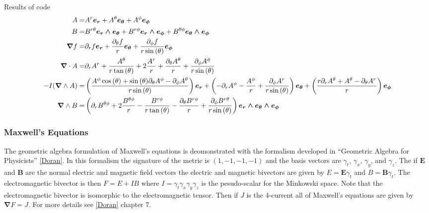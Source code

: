 \documentclass[letterpaper,10pt,english]{sphinxmanual}
\begin{document}
Results of code
  \begin{align*}
  A =& A^{r}\boldsymbol{e_{r}}+A^{\theta}\boldsymbol{e_{\theta}}+A^{\phi}\boldsymbol{e_{\phi}} \\
  B =& B^{r\theta}\boldsymbol{e_{r}\wedge e_{\theta}}+B^{r\phi}\boldsymbol{e_{r}\wedge e_{\phi}}+B^{\theta\phi}\boldsymbol{e_{\theta}\wedge e_{\phi}} \\
  \boldsymbol{\nabla}  f =& \partial_{r} f\boldsymbol{e_{r}}+\frac{\partial_{\theta} f}{r}\boldsymbol{e_{\theta}}+\frac{\partial_{\phi} f}{r \sin{\left (\theta \right )}}\boldsymbol{e_{\phi}} \\
  \boldsymbol{\nabla} \cdot A =& \partial_{r} A^{r} + \frac{A^{\theta}}{r \tan{\left (\theta \right )}} + 2 \frac{A^{r}}{r} + \frac{\partial_{\theta} A^{\theta}}{r} + \frac{\partial_{\phi} A^{\phi}}{r \sin{\left (\theta \right )}} \\
  -I (\boldsymbol{\nabla} \wedge A) =& \left ( \frac{A^{\phi} \cos{\left (\theta \right )} + \sin{\left (\theta \right )} \partial_{\theta} A^{\phi} - \partial_{\phi} A^{\theta}}{r \sin{\left (\theta \right )}}\right ) \boldsymbol{e_{r}}+\left ( - \partial_{r} A^{\phi} - \frac{A^{\phi}}{r} + \frac{\partial_{\phi} A^{r}}{r \sin{\left (\theta \right )}}\right ) \boldsymbol{e_{\theta}}+\left ( \frac{r \partial_{r} A^{\theta} + A^{\theta} - \partial_{\theta} A^{r}}{r}\right ) \boldsymbol{e_{\phi}} \\
  \boldsymbol{\nabla} \wedge B =& \left ( \partial_{r} B^{\theta\phi} + 2 \frac{B^{\theta\phi}}{r} - \frac{B^{r\phi}}{r \tan{\left (\theta \right )}} - \frac{\partial_{\theta} B^{r\phi}}{r} + \frac{\partial_{\phi} B^{r\theta}}{r \sin{\left (\theta \right )}}\right ) \boldsymbol{e_{r}\wedge e_{\theta}\wedge e_{\phi}}
  \end{align*}

\subsubsection{Maxwell's Equations}
\label{GA:maxwell-s-equations}
The geometric algebra formulation of Maxwell's equations is deomonstrated
with the formalism developed in ``Geometric Algebra for Physicists'' {\hyperref[GA:doran]{{[}Doran{]}}}.
In this formalism the signature of the metric is $(1,-1,-1,-1)$ and the
basis vectors are $\gamma_{t}$, $\gamma_{x}$, $\gamma_{y}$,
and $\gamma_{z}$.  The if $\bm{E}$ and $\bm{B}$ are the
normal electric and magnetic field vectors the electric and magnetic
bivectors are given by $E = \bm{E}\gamma_{t}$ and $B = \bm{B}\gamma_{t}$.
The electromagnetic bivector is then $F = E+IB$ where
$I = \gamma_{t}\gamma_{x}\gamma_{y}\gamma_{z}$ is the pesudo-scalar
for the Minkowski space.  Note that the electromagnetic bivector is isomorphic
to the electromagnetic tensor.  Then if $J$ is the 4-current all of
Maxwell's equations are given by $\bm{\nabla}F = J$.  For more details
see {\hyperref[GA:doran]{{[}Doran{]}}} chapter 7.
\end{document}
